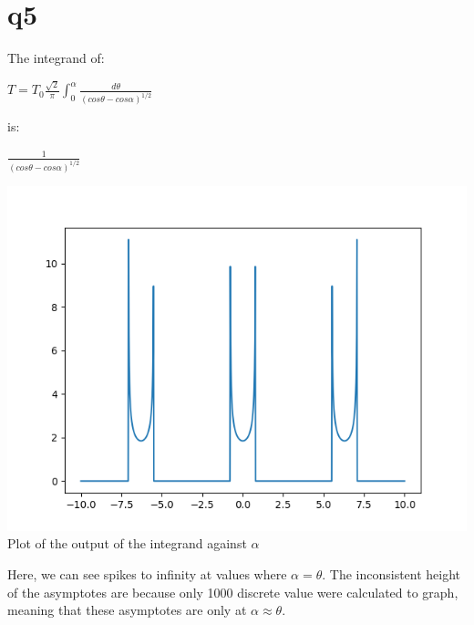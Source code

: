 \documentclass[a4paper,english]{article}
\begin{document}
    \section{q5}
    The integrand of:
    \begin{center}
        $T = T_0\frac{\sqrt{2}}{\pi}\int_0^\alpha\frac{d\theta}{(cos\theta-cos\alpha)^{1/2}}$
    \end{center}
    is:
    \begin{center}
        $\frac{1}{(cos\theta-cos\alpha)^{1/2}}$
    \end{center}
    
    
    \begin{center}
        \includegraphics[scale=0.8]{./3_5.png}
        Plot of the output of the integrand against $\alpha$
    \end{center}
    Here, we can see spikes to infinity at values where $\alpha = \theta$. The inconsistent height
    of the asymptotes are because only 1000 discrete value were calculated to graph, meaning that
    these asymptotes are only at $\alpha \approx \theta$.
\end{document}
